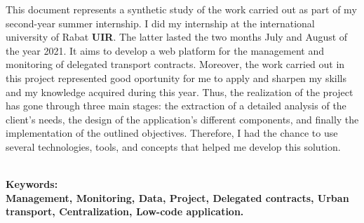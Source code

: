 \documentclass[a4paper]{report}
\begin{document}
\begin{doublespace}

    This document represents a synthetic study of the work carried out as part of my second-year summer internship.
    I did my internship at the international university of Rabat \textbf{UIR}. The latter lasted the two months
    July and August of the year 2021. It aims to develop a web platform for the management and monitoring of
    delegated transport contracts. Moreover, the work carried out in this project represented good oportunity
    for me to apply and sharpen my skills and my knowledge acquired during this year. Thus, the realization
    of the project has gone through three main stages: the extraction of a detailed analysis of the client's
    needs, the design of the application's different components, and finally the implementation of the outlined objectives.
    Therefore, I had the chance to use several technologies, tools, and concepts that helped me develop this solution.

    \textbf{\\Keywords:\\Management, Monitoring, Data, Project, Delegated contracts, Urban transport, Centralization, Low-code application.}

\end{doublespace}

\newpage

\renewcommand{\contentsname}{Table de matières}
\setcounter{tocdepth}{4}
\tableofcontents

\cleardoublepage
\end{document}
